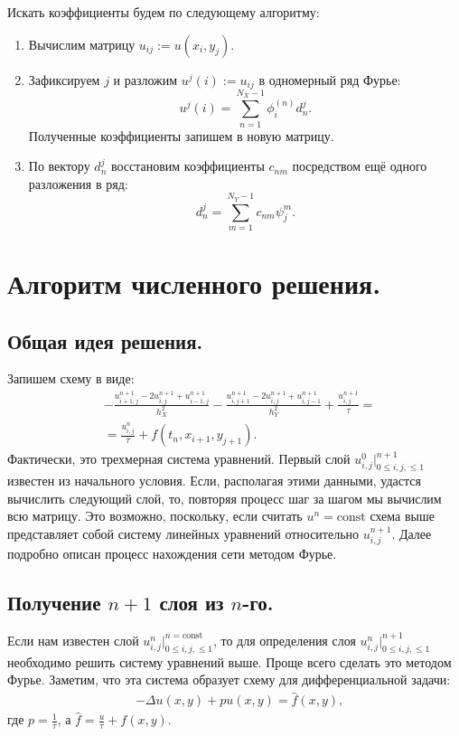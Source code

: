 \documentclass[14pt,a4paper]{extarticle}
\newcommand{\1}{\mathbbm{1}}
\begin{document}
Искать коэффициенты будем по следующему алгоритму:
\begin{enumerate}
    \item Вычислим матрицу $u_{ij}:= u(x_i, y_j)$.
    \item Зафиксируем $j$ и разложим $u^j(i) := u_{ij}$ в одномерный ряд Фурье:
          \begin{equation*}
              u^j(i) = \sum _{n = 1}^{N_X - 1} \phi_i^{(n)} d_n^j.
          \end{equation*}
          Полученные коэффициенты запишем в новую матрицу.
    \item По вектору $d_n^j$ восстановим коэффициенты $c_{nm}$ посредством ещё одного разложения в ряд:
          \begin{equation*}
              d_n^j = \sum _{m = 1}^{N_Y - 1} c_{nm} \psi_j^m.
          \end{equation*}
\end{enumerate}



\section{Алгоритм численного решения.}
\subsection{Общая идея решения.}
Запишем схему в виде:
\begin{align*} 
    &- \frac{u_{i+1, j}^{n+1} - 2 u_{i, j}^{n+1} + u_{i-1, j}^{n+1}}{h_X^2} - \frac{u_{i, j+1}^{n+1} - 2 u_{i, j}^{n+1} + u_{i, j-1}^{n+1}}{h_Y^2} + \frac{u_{i, j}^{n+1}}{\tau} = \\&= 
    \frac{u_{i, j}^n}{\tau} + f(t_{n}, x_{i+1}, y_{j+1}).
\end{align*}
Фактически, это трехмерная система уравнений. Первый слой $u_{i, j}^{0} \big|^{n+1} _{0 \leq i, j, \leq 1}$ 
известен из начального условия. Если, располагая этими данными, удастся вычислить следующий слой, то, повторяя процесс шаг за шагом мы вычислим всю матрицу. Это возможно, поскольку, если считать $u^{n} =\text{const}$ схема выше представляет собой систему линейных уравнений относительно $u_{i, j}^{n+1}$. 
Далее подробно описан процесс нахождения сети методом Фурье.
\subsection{Получение $n + 1$ слоя из $n$-го.}
Если нам известен слой $u_{i, j}^{n} \big|^{n = \text{const}} _{0 \leq i, j, \leq 1}$, то для определения слоя $u_{i, j}^{n} \big|^{n+1} _{0 \leq i, j, \leq 1}$ необходимо решить систему уравнений выше. Проще всего сделать это методом Фурье. Заметим, что эта система образует схему для дифференциальной задачи:
\begin{align*} 
    & - \Delta u(x, y) + p u(x , y) = \hat f(x, y), 
\end{align*}
где $p = \frac{1}{\tau}$, а $\hat f = \frac{u}{\tau} + f(x, y)$.
\end{document}
